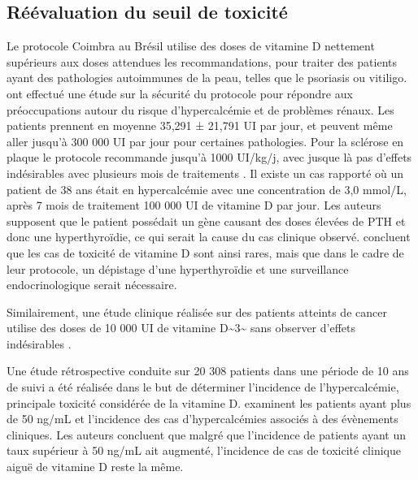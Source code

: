 \documentclass[
  a4paper,
  DIV=11,
  numbers=noendperiod,
  listof=totoc]{scrreprt}
\begin{document}
\hypertarget{ruxe9uxe9valuation-du-seuil-de-toxicituxe9}{%
\subsection{Réévaluation du seuil de
toxicité}\label{ruxe9uxe9valuation-du-seuil-de-toxicituxe9}}

Le protocole Coimbra au Brésil utilise des doses de vitamine D nettement
supérieurs aux doses attendues les recommandations, pour traiter des
patients ayant des pathologies autoimmunes de la peau, telles que le
psoriasis ou vitiligo. \textcite{Amon.2022} ont effectué une étude sur
la sécurité du protocole pour répondre aux préoccupations autour du
risque d'hypercalcémie et de problèmes rénaux. Les patients prennent en
moyenne 35,291 ± 21,791 UI par jour, et peuvent même aller jusqu'à 300
000 UI par jour pour certaines pathologies. Pour la sclérose en plaque
le protocole recommande jusqu'à 1000 UI/kg/j, avec jusque là pas
d'effets indésirables avec plusieurs mois de traitements
\textcite{Lemke.2021}. Il existe un cas rapporté où un patient de 38 ans
était en hypercalcémie avec une concentration de 3,0 mmol/L, après 7
mois de traitement 100 000 UI de vitamine D par jour. Les auteurs
supposent que le patient possédait un gène causant des doses élevées de
PTH et donc une hyperthyroïdie, ce qui serait la cause du cas clinique
observé. \textcite{Lemke.2021} concluent que les cas de toxicité de
vitamine D sont ainsi rares, mais que dans le cadre de leur protocole,
un dépistage d'une hyperthyroïdie et une surveillance endocrinologique
serait nécessaire.

Similairement, une étude clinique réalisée sur des patients atteints de
cancer utilise des doses de 10 000 UI de vitamine
D\textasciitilde3\textasciitilde{} sans observer d'effets indésirables
\autocite{Amir.2009}.

Une étude rétrospective conduite sur 20 308 patients dans une période de
10 ans de suivi a été réalisée dans le but de déterminer l'incidence de
l'hypercalcémie, principale toxicité considérée de la vitamine D.
\textcite{Dudenkov.2015} examinent les patients ayant plus de 50 ng/mL
et l'incidence des cas d'hypercalcémies associés à des évènements
cliniques. Les auteurs concluent que malgré que l'incidence de patients
ayant un taux supérieur à 50 ng/mL ait augmenté, l'incidence de cas de
toxicité clinique aiguë de vitamine D reste la même.
\end{document}
